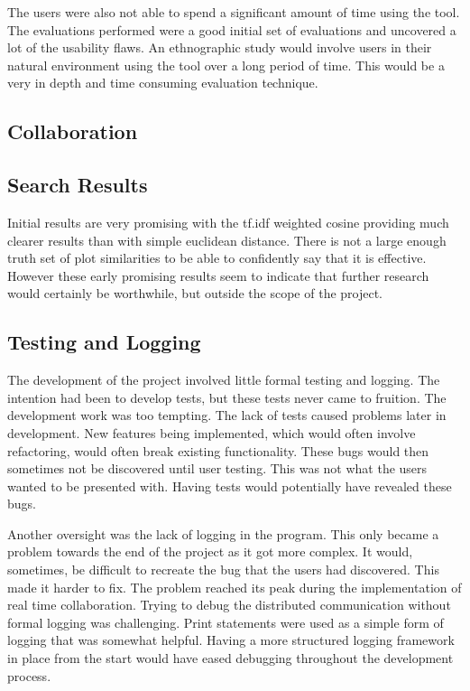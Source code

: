 The users were also not able to spend a significant amount of time using the tool.  The evaluations performed were a good initial set of evaluations and uncovered a lot of the usability flaws.  An ethnographic study would involve users in their natural environment using the tool over a long period of time.  This would be a very in depth and time consuming evaluation technique.

\subsection{Collaboration}

\subsection{Search Results}
Initial results are very promising with the tf.idf weighted cosine providing much clearer results than with simple euclidean distance.  There is not a large enough truth set of plot similarities to be able to confidently say that it is effective.  However these early promising results seem to indicate that further research would certainly be worthwhile, but outside the scope of the project.


\subsection{Testing and Logging}

The development of the project involved little formal testing and logging.  The intention had been to develop tests, but these tests never came to fruition.  The development work was too tempting. The lack of tests caused problems later in development.  New features being implemented, which would often involve refactoring, would often break existing functionality.  These bugs would then sometimes not be discovered until user testing.  This was not what the users wanted to be presented with.  Having tests would potentially have revealed these bugs.

Another oversight was the lack of logging in the program.  This only became a problem towards the end of the project as it got more complex.  It would, sometimes, be difficult to recreate the bug that the users had discovered.  This made it harder to fix.  The problem reached its peak during the implementation of real time collaboration.  Trying to debug the distributed communication without formal logging was challenging.  Print statements were used as a simple form of logging that was somewhat helpful.  Having a more structured logging framework in place from the start would have eased debugging throughout the development process.

